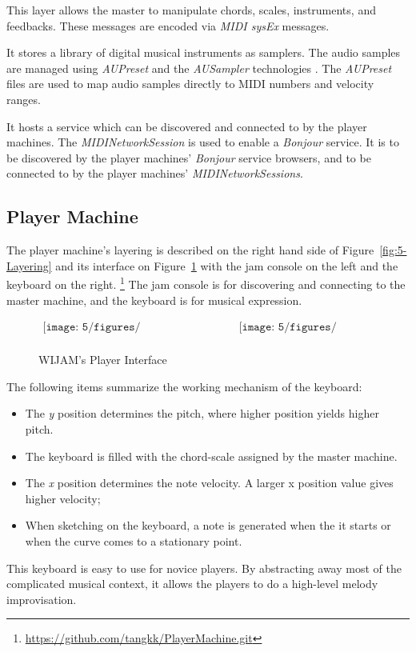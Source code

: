 This layer allows the master to manipulate chords, scales, instruments, and feedbacks. These messages are encoded via \textit{MIDI sysEx} messages.

It stores a library of digital musical instruments as samplers. The audio samples are managed using \textit{AUPreset} and the \textit{AUSampler} technologies \cite{AUSampler}. The \textit{AUPreset} files are used to map audio samples directly to MIDI numbers and velocity ranges.

It hosts a service which can be discovered and connected to by the player machines. The \textit{MIDINetworkSession} is used to enable a \textit{Bonjour} service. It is to be discovered by the player machines' \textit{Bonjour} service browsers, and to be connected to by the player machines' \textit{MIDINetworkSessions}.

\subsection{Player Machine}
The player machine's layering is described on the right hand side of Figure~\ref{fig:5-Layering} and its interface on Figure~\ref{fig:5-PlayerMachineVC} with the jam console on the left and the keyboard on the right. \footnote{\url{https://github.com/tangkk/PlayerMachine.git}} The jam console is for discovering and connecting to the master machine, and the keyboard is for musical expression.
\begin{figure}[htbp]
\begin{center}$
\begin{array}{cc}
\texttt{[image: 5/figures/PlayerMachineVC.png]} &
\texttt{[image: 5/figures/Simple.png]} \\
\end{array}$
\end{center}
\caption{WIJAM's Player Interface}
\label{fig:5-PlayerMachineVC}
\end{figure}

\noindent
The following items summarize the working mechanism of the keyboard:
\begin{itemize}
\item
The \textit{y} position determines the pitch, where higher position yields higher pitch.
\item
The keyboard is filled with the chord-scale assigned by the master machine.
\item
The \textit{x} position determines the note velocity. A larger x position value gives higher velocity;
\item
When sketching on the keyboard, a note is generated when the it starts or when the curve comes to a stationary point.
\end{itemize}
This keyboard is easy to use for novice players. By abstracting away most of the complicated musical context, it allows the players to do a high-level melody improvisation.

